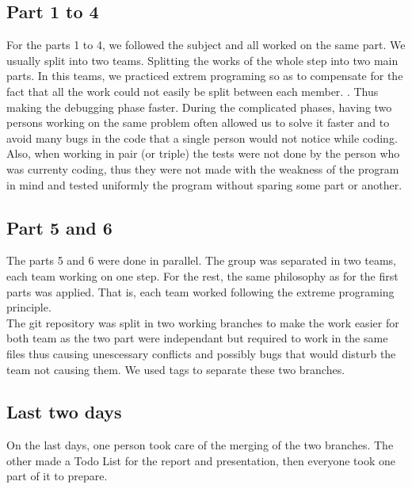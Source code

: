\subsection{Part 1 to 4}

For the parts 1 to 4, we followed the subject and all worked on the same part. We usually split into two teams.
Splitting the works of the whole step into two main parts. In this teams, we practiced extrem programing so as to
compensate for the fact that all the work could not easily be split between each member. . Thus making the debugging phase faster. During the complicated phases,
having two persons working on the same problem often allowed us to solve it faster and to avoid many bugs in the code
that a single person would not notice while coding.\\
Also, when working in pair (or triple) the tests were not done by the person who was currenty coding, thus they 
were not made with the weakness of the program in mind and tested uniformly the program without sparing some part 
or another.

\subsection{Part 5 and 6}

The parts 5 and 6 were done in parallel. The group was separated in two teams, each team working on one step.
For the rest, the same philosophy as for the first parts was applied. That is, each team worked following the
extreme programing principle.\\
The git repository was split in two working branches to make the work easier for both team as the two part were
independant but required to work in the same files thus causing unescessary conflicts and possibly bugs that would
disturb the team not causing them. We used tags to separate these two branches.

\subsection{Last two days}

On the last days, one person took care of the merging of the two branches. The other made a Todo List for the report 
and presentation, then everyone took one part of it to prepare. 

